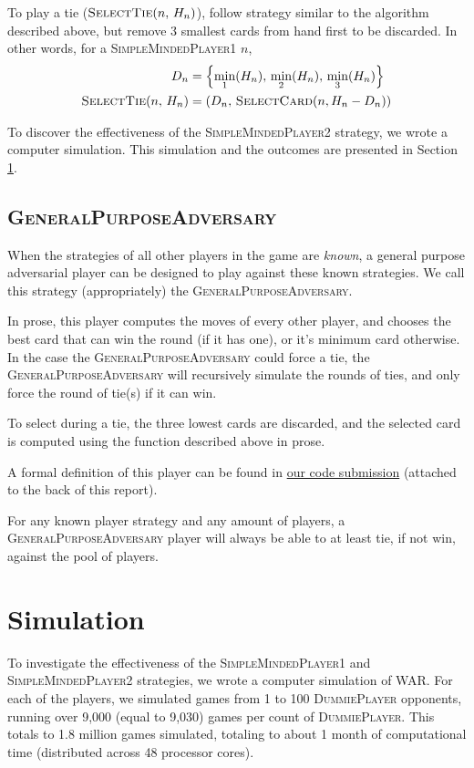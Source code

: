\documentclass[conference]{IEEEtran}
\newcommand\DP{\textsc{DummiePlayer}}
\newcommand\SMPo{\textsc{SimpleMindedPlayer1}}
\newcommand\SMPt{\textsc{SimpleMindedPlayer2}}
\newcommand\GPA{\textsc{GeneralPurposeAdversary}}
\begin{document}
To play a tie ($\textsc{SelectTie}(n,\,H_n)$), follow strategy similar to the
algorithm described above, but remove 3 smallest cards from hand first to be
discarded. In other words, for a \SMPo{} $n$,
\begin{align*}
     D_n &= \left\{\min_1(H_n),\,\min_2(H_n),\,\min_3(H_n)\right\} \\
     \textsc{SelectTie}(n,\,H_n) &= \left(D_n,\,\textsc{SelectCard}(n, H_n - D_n)\right)
\end{align*}

To discover the effectiveness of the \SMPt{} strategy, we wrote a computer
simulation. This simulation and the outcomes are presented in Section
\ref{sec:sim}.

\subsection{\GPA}

When the strategies of all other players in the game are \emph{known}, a
general purpose adversarial player can be designed to play against these known
strategies. We call this strategy (appropriately) the \GPA{}.

In prose, this player computes the moves of every other player, and chooses
the best card that can win the round (if it has one), or it's minimum card
otherwise. In the case the \GPA{} could force a tie, the \GPA{} will
recursively simulate the rounds of ties, and only force the round of tie(s) if
it can win.

To select during a tie, the three lowest cards are discarded, and the selected
card is computed using the function described above in prose.

A formal definition of this player can be found in \hyperref[sec:code]{our code
submission} (attached to the back of this report).

For any known player strategy and any amount of players, a \GPA{} player will
always be able to at least tie, if not win, against the pool of players.

\section{Simulation}
\label{sec:sim}

To investigate the effectiveness of the \SMPo{} and \SMPt{} strategies, we
wrote a computer simulation of WAR. For each of the players, we simulated games
from 1 to 100 \DP{} opponents, running over 9,000 (equal to 9,030) games per
count of \DP{}. This totals to 1.8 million games simulated, totaling to about 1
month of computational time (distributed across 48 processor cores).
\end{document}
